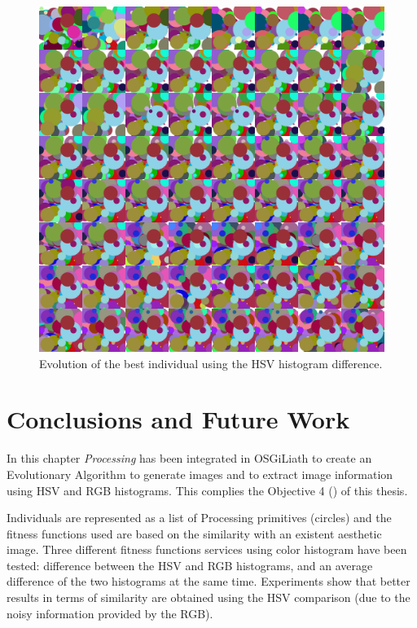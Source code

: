\begin{figure}
   \includegraphics[scale =0.10] {gfx/art/collage.png}
\caption{Evolution of the best individual using the HSV histogram difference. }
\label{fig:collage}
\end{figure}

\section{Conclusions and Future Work}
\label{sec:conclusions}
In this chapter {\em Processing} has been integrated in OSGiLiath
to create an Evolutionary Algorithm  to generate images and to extract
image information using HSV and RGB histograms. This complies the Objective 4 (\objectiveresearch) of this thesis.

Individuals are represented as a list of Processing primitives
(circles) and the fitness functions used are based on the similarity
with an existent aesthetic image. %
 Three different fitness functions services
using color histogram have been tested: difference between the HSV and
RGB histograms, and an average difference of the two histograms at the
same time. Experiments show that better results in terms of similarity
are obtained using the HSV comparison (due to the noisy information
provided by the RGB).  %

